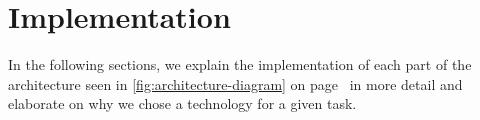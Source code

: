 \chapter{Implementation}
\label{sec:implementation}

In the following sections, we explain the implementation of each part of the architecture seen in
\autoref{fig:architecture-diagram} on page~\pageref{fig:architecture-diagram} in more detail and
elaborate on why we chose a technology for a given task.










